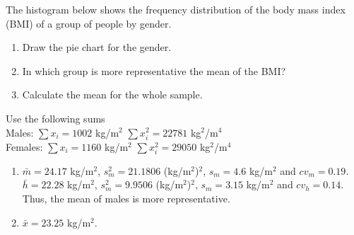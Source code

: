 {The histogram below shows the frequency distribution of the body mass index (BMI) of a group of people by gender.
\begin{center}
\resizebox{0.6\textwidth}{!}{}
\end{center}

\begin{enumerate}
\item Draw the pie chart for the gender.
\item In which group is more representative the mean of the BMI?
\item Calculate the mean for the whole sample.
\end{enumerate}
Use the following sums\\
Males: $\sum x_i=1002$ kg/m$^2$ \quad $\sum x_i^2 = 22781$ kg$^2$/m$^4$ \\
Females: $\sum x_i=1160$ kg/m$^2$ \quad $\sum x_i^2 = 29050$ kg$^2$/m$^4$
}
{\begin{enumerate}[start=2]
\item $\bar{m} =24.17$ kg/m$^2$, $s_{m}^2=21.1806$ (kg/m$^2$)$^2$, $s_m=4.6$ kg/m$^2$ and $cv_m = 0.19$.\\
$\bar{h} =22.28$ kg/m$^2$, $s_{m}^2=9.9506$ (kg/m$^2$)$^2$, $s_m=3.15$ kg/m$^2$ and $cv_h = 0.14$.
Thus, the mean of males is more representative.
\item $\bar{x}=23.25$ kg/m$^2$.
\end{enumerate}
}
